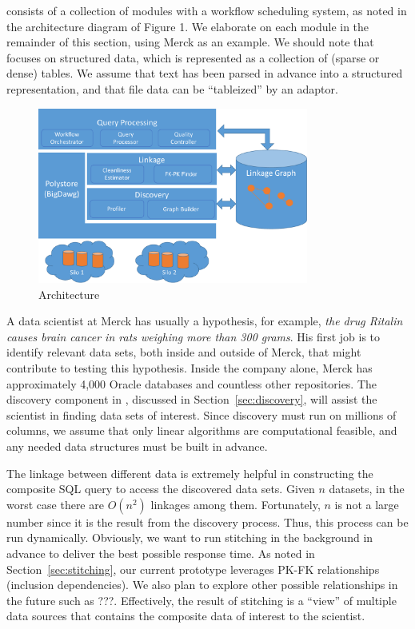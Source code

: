 \dcv consists of a collection of modules with a workflow scheduling system, as noted in the architecture diagram of Figure 1. We elaborate on each module in the remainder of this section, using Merck as an example. 
We should note that \dcv focuses on structured data, which is represented as a collection of (sparse or dense) tables.  
We assume that text has been parsed in advance into a structured representation, and that file data can be “tableized” by an adaptor.




\begin{figure}[!t]
\includegraphics[width=3.5in]{arch3.pdf}
\caption{\dcv Architecture}
\label{fig:arch}
\end{figure}


\stitle{[Discovery]} A data scientist at Merck has usually a hypothesis, for example, {\it the drug Ritalin causes brain cancer in rats weighing more than 300 grams}.  
His first job is to identify relevant data sets, both inside and outside of Merck, that might contribute to testing this hypothesis. Inside the company alone, Merck has approximately 4,000 Oracle databases and countless other repositories. The discovery component in \dcv, discussed in Section~\ref{sec:discovery}, will assist the scientist in finding data sets of interest.  Since discovery must run on millions of columns, we assume that only linear algorithms are computational feasible, and any needed data structures must be built in advance.


\stitle{[Stitching]} The linkage between different data is extremely helpful in constructing the composite \textsf{SQL} query to access the discovered data sets. 
Given $n$ datasets, in the worst case there are $O(n^2)$ linkages among them.  
Fortunately, $n$ is not a large number since it is the result from the discovery process. Thus, this process can be run dynamically.  Obviously, we want to run stitching in the background in advance to deliver the best possible response time. As noted in Section~\ref{sec:stitching}, our current prototype leverages PK-FK relationships (inclusion dependencies).
We also plan to explore other possible relationships in the future such as ???.  
Effectively, the result of stitching is a ``view'' of multiple data sources that contains the composite data of interest to the scientist. 


